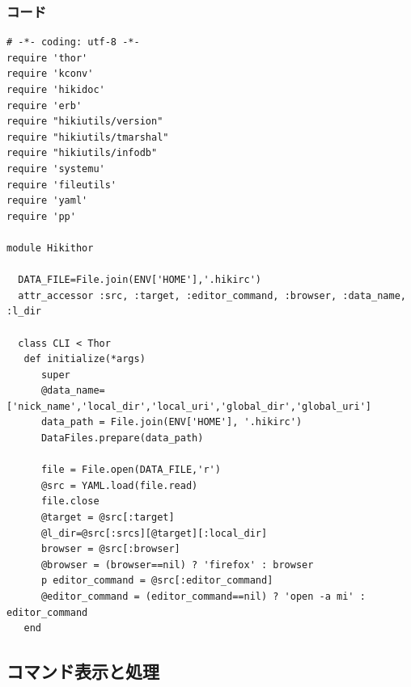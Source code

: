 \subsubsection{コード}\begin{lstlisting}[style=customRuby]
# -*- coding: utf-8 -*-                                                         
require 'thor'
require 'kconv'
require 'hikidoc'
require 'erb'
require "hikiutils/version"
require "hikiutils/tmarshal"
require "hikiutils/infodb"
require 'systemu'
require 'fileutils'
require 'yaml'
require 'pp'

module Hikithor

  DATA_FILE=File.join(ENV['HOME'],'.hikirc')
  attr_accessor :src, :target, :editor_command, :browser, :data_name, :l_dir

  class CLI < Thor
   def initialize(*args)
      super
      @data_name=['nick_name','local_dir','local_uri','global_dir','global_uri']
      data_path = File.join(ENV['HOME'], '.hikirc')
      DataFiles.prepare(data_path)

      file = File.open(DATA_FILE,'r')
      @src = YAML.load(file.read)
      file.close
      @target = @src[:target]
      @l_dir=@src[:srcs][@target][:local_dir]
      browser = @src[:browser]
      @browser = (browser==nil) ? 'firefox' : browser
      p editor_command = @src[:editor_command]
      @editor_command = (editor_command==nil) ? 'open -a mi' : editor_command
   end
\end{lstlisting}
\subsection{コマンド表示と処理}
